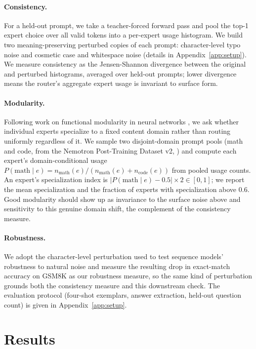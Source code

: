 \documentclass{article}
\begin{document}
\paragraph{Consistency.} For a held-out prompt, we take a teacher-forced forward pass and
pool the top-1 expert choice over all valid tokens into a per-expert usage histogram. We
build two meaning-preserving perturbed copies of each prompt: character-level typo noise
and cosmetic case and whitespace noise (details in Appendix~\ref{app:setup}). We measure
consistency as the Jensen-Shannon divergence \citep{lin1991divergence} between the
original and perturbed histograms, averaged over held-out prompts; lower divergence means
the router's aggregate expert usage is invariant to surface form.

\paragraph{Modularity.} Following work on functional modularity in neural networks
\citep{csordas2021modular}, we ask whether individual experts specialize to a fixed
content domain rather than routing uniformly regardless of it. We sample two
disjoint-domain prompt pools (math and code, from the Nemotron Post-Training Dataset v2,
\citealp{nvidia2025nemotron}) and compute each expert's domain-conditional usage
$P(\text{math} \mid e) = n_{\text{math}}(e) / (n_{\text{math}}(e) + n_{\text{code}}(e))$
from pooled usage counts. An expert's specialization index is $|P(\text{math}\mid e) -
0.5| \times 2 \in [0,1]$; we report the mean specialization and the fraction of experts
with specialization above $0.6$. Good modularity should show up as invariance to the
surface noise above and sensitivity to this genuine domain shift, the complement of the
consistency measure.

\paragraph{Robustness.} We adopt the character-level perturbation used to test sequence
models' robustness to natural noise \citep{belinkov2018synthetic} and measure the
resulting drop in exact-match accuracy on GSM8K as our robustness measure, so the same
kind of perturbation grounds both the consistency measure and this downstream check. The
evaluation protocol (four-shot exemplars, answer extraction, held-out question count) is
given in Appendix~\ref{app:setup}.

\section{Results}
\end{document}
